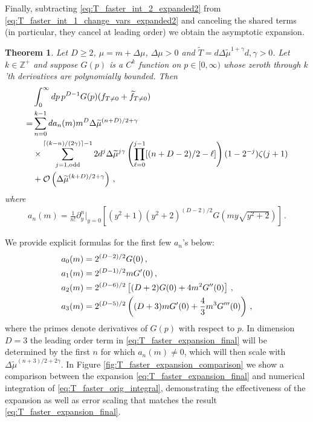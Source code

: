 \documentclass[sn-mathphys,Numbered]{sn-jnl}
\newtheorem{theorem}{Theorem}
\begin{document}
Finally, subtracting \eqref{eq:T_faster_int_2_expanded2} from \eqref{eq:T_faster_int_1_change_vars_expanded2} and canceling the shared terms (in particular, they cancel at leading order) we  obtain the asymptotic expansion.
\begin{theorem}\label{thms:T_decay_faster}
Let $D\geq 2$,     $\mu=m+\Delta\mu$, $\Delta\mu>0$ and $\widetilde{T}=d\Delta\widetilde{\mu}^{1+\gamma}$$d,\gamma>0$.  Let $k\in\mathbb{Z}^+$ and suppose $G(p)$ is a $C^k$ function on $p\in[0,\infty)$ whose zeroth through $k$'th derivatives are polynomially bounded. Then
\begin{align}
    &\int_0^\infty dp\, p^{D-1} G(p)(f_{T\neq 0}+\widetilde{f}_{T\neq 0})\label{eq:T_faster_orig_integral}\\
    =& \sum_{n=0}^{k-1} da_n(m)m^{D}\Delta\widetilde{\mu}^{(n+D)/2+\gamma}\label{eq:T_faster_expansion_final}\\
    &\times\sum_{j=1,\mathrm{odd}}^{\lceil(k-n)/(2\gamma)\rceil-1}
 2d^j\Delta\widetilde{\mu}^{j\gamma}\left(\prod_{\ell=0}^{j-1}[(n+D-2)/2-\ell] \right)(1-2^{-j})\zeta(j+1) \notag\\
    &+\mathcal{O}\left(\Delta\widetilde{\mu}^{(k+D)/2+\gamma}\right)\,,\notag
\end{align} 
where
\begin{align}\label{eq:an_def}
a_n(m)=\frac{1}{n!}\partial_y^n|_{y=0}\left[  (y^2+1)(  y^2+2)^{(D-2)/2} G\left(my\sqrt{y^2+2}\right)\right]\,.
\end{align}
\end{theorem}
We provide explicit formulas for the first few  $a_n$'s below:
\begin{align}\label{eq:first_few_a_ns}
  &a_0(m)=2^{(D-2)/2} G(0)\,,\\
  &a_1(m)=2^{(D-1)/2}mG^\prime(0)\,,\notag\\
  &a_2(m)=2^{(D-6)/2}\left[(D+2)G(0)+4m^2 G^{\prime\prime}(0)\right]\,,\notag\\
  &a_3(m)=2^{(D - 5)/2} \left((D + 3) m G^\prime(0) +  \frac{4}{3}m^3 G^{\prime\prime\prime}(0) \right)\,,\notag
\end{align}
where the primes denote derivatives of $G(p)$ with respect to $p$. In dimension $D=3$ the leading order term in \eqref{eq:T_faster_expansion_final} will be determined by the first $n$ for which $a_n(m)\neq 0$, which will then scale with $\Delta\widetilde{\mu}^{(n+3)/2+2\gamma}$.  In Figure \ref{fig:T_faster_expansion_comparison} we show a comparison between the expansion \eqref{eq:T_faster_expansion_final} and numerical integration of \eqref{eq:T_faster_orig_integral}, demonstrating the effectiveness of the expansion as well as error scaling that matches the result \eqref{eq:T_faster_expansion_final}.
\end{document}
